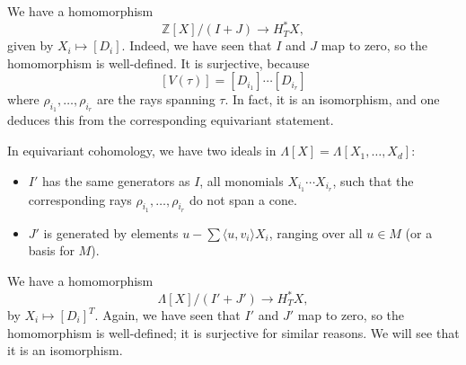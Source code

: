 We have a homomorphism
\[
	\mathbb{Z}[X] / (I + J) \to H^*_T X,
\]
given by \( X_i \mapsto [D_i] \). Indeed, we have seen that \( I \) and \( J \) map to zero, so the homomorphism is well-defined. It is surjective, because
\[
	[V(\tau)] = [D_{i_1}] \cdots [D_{i_r}]
\]
where \( \rho_{i_1}, \ldots, \rho_{i_r} \) are the rays spanning \( \tau \). In fact, it is an isomorphism, and one deduces this from the corresponding equivariant statement.

In equivariant cohomology, we have two ideals in \( \Lambda[X] = \Lambda[X_1, \ldots, X_d] \):
\begin{itemize}
	\item \( I' \) has the same generators as \( I \), all monomials \( X_{i_1} \cdots X_{i_r} \), such that the corresponding rays \( \rho_{i_1}, \ldots, \rho_{i_r} \) do not span a cone.
	\item \( J' \) is generated by elements \( u - \sum \langle u, v_i \rangle X_i \), ranging over all \( u \in M \) (or a basis for \( M \)).
\end{itemize}

We have a homomorphism
\[
	\Lambda[X] / (I' + J') \to H^*_T X,
\]
by \( X_i \mapsto [D_i]^T \). Again, we have seen that \( I' \) and \( J' \) map to zero, so the homomorphism is well-defined; it is surjective for similar reasons. We will see that it is an isomorphism.


